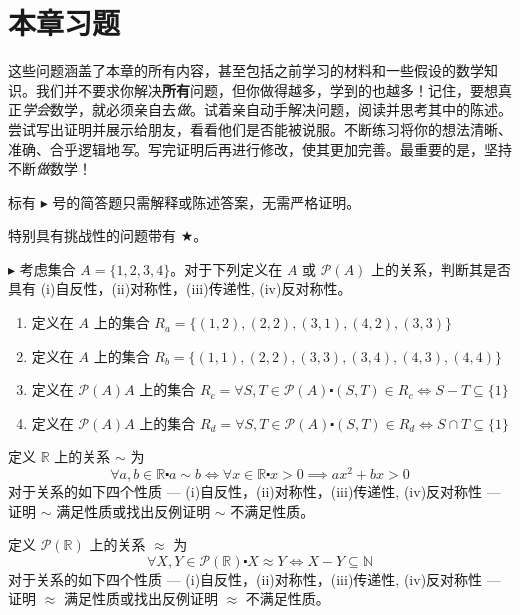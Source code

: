 \section{本章习题}

这些问题涵盖了本章的所有内容，甚至包括之前学习的材料和一些假设的数学知识。我们并不要求你解决\textbf{所有}问题，但你做得越多，学到的也越多！记住，要想真正\emph{学会}数学，就必须亲自去\emph{做}。试着亲自动手解决问题，阅读并思考其中的陈述。尝试写出证明并展示给朋友，看看他们是否能被说服。不断练习将你的想法清晰、准确、合乎逻辑地\emph{写}。写完证明后再进行修改，使其更加完善。最重要的是，坚持不断\emph{做}数学！

标有 $\blacktriangleright$ 号的简答题只需解释或陈述答案，无需严格证明。

特别具有挑战性的问题带有 $\bigstar$。

\begin{exercise}
    $\blacktriangleright$ 考虑集合 $A = \{1, 2, 3, 4\}$。对于下列定义在 $A$ 或 $\mathcal{P}(A)$ 上的关系，判断其是否具有 (i)自反性，(ii)对称性，(iii)传递性, (iv)反对称性。
    \begin{enumerate}[label=(\alph*)]
        \item 定义在 $A$ 上的集合 $R_a= \{ (1, 2),(2, 2),(3, 1),(4, 2),(3, 3) \}$
        \item 定义在 $A$ 上的集合 $R_b= \{  (1, 1),(2, 2),(3, 3),(3, 4),(4, 3),(4, 4) \}$
        \item 定义在 $\mathcal{P}(A)A$ 上的集合 $R_c= \forall S, T \in \mathcal{P}(A) \centerdot (S, T) \in R_c \iff S - T \subseteq \{1\}$
        \item 定义在 $\mathcal{P}(A)A$ 上的集合 $R_d= \forall S, T \in \mathcal{P}(A) \centerdot (S, T) \in R_d \iff S \cap T \subseteq \{1\}$
    \end{enumerate}
\end{exercise}

\begin{exercise}
    定义 $\mathbb{R}$ 上的关系 $\sim$ 为
    \[\forall a, b \in \mathbb{R} \centerdot a \sim b \iff  \forall x \in \mathbb{R} \centerdot x > 0 \implies ax^2 + bx > 0\]
    对于关系的如下四个性质 --- (i)自反性，(ii)对称性，(iii)传递性, (iv)反对称性 --- 证明 $\sim$ 满足性质或找出反例证明 $\sim$ 不满足性质。
\end{exercise}

\begin{exercise}
    定义 $\mathcal{P}(\mathbb{R})$ 上的关系 $\approx$ 为
    \[\forall X, Y \in \mathcal{P}(\mathbb{R}) \centerdot X \approx Y \iff X - Y \subseteq \mathbb{N}\]
    对于关系的如下四个性质 --- (i)自反性，(ii)对称性，(iii)传递性, (iv)反对称性 --- 证明 $\approx$ 满足性质或找出反例证明 $\approx$ 不满足性质。
\end{exercise}

